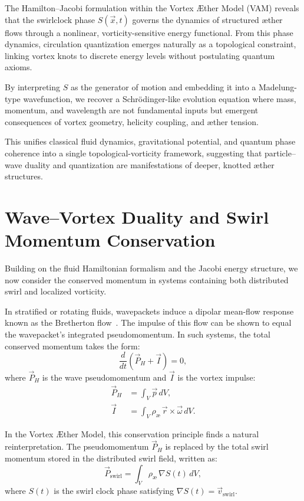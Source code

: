 \documentclass[preprint]{revtex4-2}
\begin{document}
The Hamilton–Jacobi formulation within the Vortex \AE{}ther Model (VAM) reveals that the swirlclock phase \( S(\vec{x}, t) \) governs the dynamics of structured æther flows through a nonlinear, vorticity-sensitive energy functional. From this phase dynamics, circulation quantization emerges naturally as a topological constraint, linking vortex knots to discrete energy levels without postulating quantum axioms.


By interpreting $S$ as the generator of motion and embedding it into a Madelung-type wavefunction, we recover a Schrödinger-like evolution equation where mass, momentum, and wavelength are not fundamental inputs but emergent consequences of vortex geometry, helicity coupling, and æther tension.


This unifies classical fluid dynamics, gravitational potential, and quantum phase coherence into a single topological-vorticity framework, suggesting that particle–wave duality and quantization are manifestations of deeper, knotted æther structures.
\section*{Wave–Vortex Duality and Swirl Momentum Conservation}

Building on the fluid Hamiltonian formalism and the Jacobi energy structure, we now consider the conserved momentum in systems containing both distributed swirl and localized vorticity.

In stratified or rotating fluids, wavepackets induce a dipolar mean-flow response known as the Bretherton flow~\cite{buhler2005wave}. The impulse of this flow can be shown to equal the wavepacket’s integrated pseudomomentum. In such systems, the total conserved momentum takes the form:
\begin{equation}
    \frac{d}{dt} \left( \vec{P}_H + \vec{I} \right) = 0,
\end{equation}
where \( \vec{P}_H \) is the wave pseudomomentum and \( \vec{I} \) is the vortex impulse:
\begin{align}
    \vec{P}_H &= \int_V \vec{p} \, dV, \\
    \vec{I} &= \int_V \rho_\text{\ae} \, \vec{r} \times \vec{\omega} \, dV.
\end{align}

In the Vortex Æther Model, this conservation principle finds a natural reinterpretation. The pseudomomentum \( \vec{P}_H \) is replaced by the total swirl momentum stored in the distributed swirl field, written as:
\begin{equation}
    \vec{P}_\text{swirl} = \int_V \rho_\text{\ae} \, \nabla S(t) \, dV,
\end{equation}
where \( S(t) \) is the swirl clock phase satisfying \( \nabla S(t) = \vec{v}_\text{swirl} \).
\end{document}
